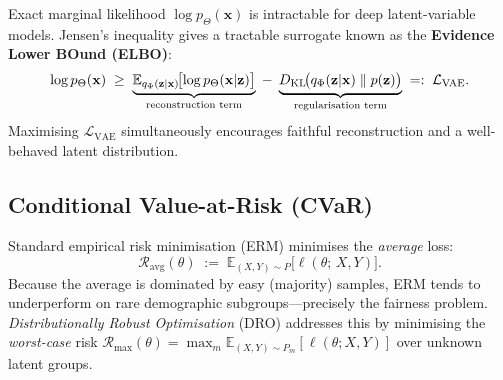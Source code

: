 Exact marginal likelihood $\log p_\Theta(\mathbf{x})$ is
intractable for deep latent-variable models.
Jensen's inequality gives a tractable surrogate known as
the \textbf{Evidence Lower BOund (ELBO)}:
\begin{equation}
  \log p_\Theta(\mathbf{x})
  \;\geq\;
  \underbrace{%
    \mathbb{E}_{q_\Phi(\mathbf{z}|\mathbf{x})}\!
    \bigl[\log p_\Theta(\mathbf{x}|\mathbf{z})\bigr]
  }_{\text{reconstruction term}}
  \;-\;
  \underbrace{%
    D_{\mathrm{KL}}\!\bigl(
      q_\Phi(\mathbf{z}|\mathbf{x})
      \;\|\;
      p(\mathbf{z})
    \bigr)
  }_{\text{regularisation term}}
  \;=:\; \mathcal{L}_{\mathrm{VAE}}.
  \label{eq:elbo}
\end{equation}
Maximising $\mathcal{L}_{\mathrm{VAE}}$ simultaneously encourages
faithful reconstruction and a well-behaved latent distribution.

\subsection{Conditional Value-at-Risk (CVaR)}
\label{sec:cvar}

Standard empirical risk minimisation (ERM) minimises the
\emph{average} loss:
\begin{equation}
  \mathcal{R}_{\mathrm{avg}}(\theta)
  \;:=\; \mathbb{E}_{(X,Y)\sim P}\!\bigl[\ell(\theta;\,X,Y)\bigr].
  \label{eq:erm}
\end{equation}
Because the average is dominated by easy (majority) samples, ERM
tends to underperform on rare demographic subgroups—precisely the
fairness problem.  \emph{Distributionally Robust Optimisation} (DRO)
addresses this by minimising the \emph{worst-case} risk
$\mathcal{R}_{\max}(\theta) = \max_m \mathbb{E}_{(X,Y)\sim P_m}
[\ell(\theta;X,Y)]$ over unknown latent groups.

